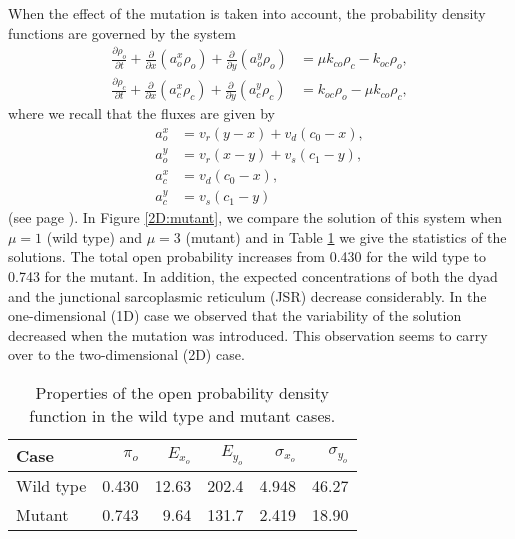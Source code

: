 {When the effect of the mutation is taken into account, the probability density functions are governed by the system 
\begin{align}
\frac{\partial\rho_{o}}{\partial t}+\frac{\partial}{\partial x}\left(
a_{o}^{x}\rho_{o}\right)  +\frac{\partial}{\partial y}\left(  a_{o}^{y}
\rho_{o}\right)   &  =\mu k_{co}\rho_{c}-k_{oc}\rho_{o},\label{eq:pdf211}\\
\frac{\partial\rho_{c}}{\partial t}+\frac{\partial}{\partial x}\left(
a_{c}^{x}\rho_{c}\right)  +\frac{\partial}{\partial y}\left(  a_{c}^{y}
\rho_{c}\right)   &  =k_{oc}\rho_{o}-\mu k_{co}\rho_{c},\label{eq:pdf212}
\end{align}
where we recall that the fluxes are given by
\begin{align}
a_{o}^{x} &  =v_{r}\left(  y-x\right)  +v_{d}\left(  c_{0}-x\right)
,\nonumber\\
a_{o}^{y} &  =v_{r}\left(  x-y\right)  +v_{s}\left(  c_{1}-y\right)
,\label{eq:fluxes2D}\\
a_{c}^{x} &  =v_{d}\left(  c_{0}-x\right)  ,\nonumber\\
a_{c}^{y} &  =v_{s}\left(  c_{1}-y\right) \nonumber
\end{align}
(see page \pageref{eq:pdf21}).
In Figure \ref{2D:mutant}, we compare the solution of this system when $\mu=1$ (wild type)
and $\mu=3$ (mutant) and in Table \ref{tab:wtmt_tab_2D} we give the statistics of the solutions. The total 
open probability increases from 0.430 for the wild type to 0.743 for the mutant. In addition, the expected concentrations
of both the dyad and the junctional sarcoplasmic reticulum (JSR) decrease considerably. In the one-dimensional (1D) case we observed that the variability of the solution decreased when the mutation was introduced. This observation seems to carry over to the two-dimensional (2D) case.



\begin{table}  \begin{center}
\begin{tabular}
[c]{|l|r|r|r|r|r|}\hline
Case & $\pi_o$ & $E_{x_o}$ &
 $E_{y_o}$ & $\sigma_{x_o}$ & $\sigma_{y_o}$ \\[1mm]\hline\hline
Wild type & 0.430 & 12.63 & 202.4 &4.948  & 46.27  \\\hline
Mutant & 0.743 & 9.64 & 131.7 & 2.419 &  18.90  \\ \hline
\end{tabular}
 \end{center}
\caption{Properties of the open probability density function in the
wild type and mutant cases. \label{tab:wtmt_tab_2D}}
\end{table}



}
